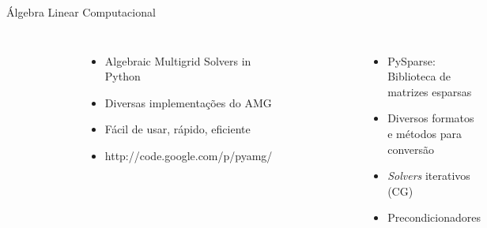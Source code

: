 \documentclass[12pt,t,graphics]{beamer}
\begin{document}
\begin{frame}[t]{Álgebra Linear Computacional}
	\begin{columns}
		\begin{figure}
			\centering
			\includegraphics[scale=0.2]{img/pyamg.png}
		\end{figure}
		\begin{itemize}
			\item Algebraic Multigrid Solvers in Python
			\item Diversas implementações do AMG
			\item Fácil de usar, rápido, eficiente
			\item http://code.google.com/p/pyamg/
		\end{itemize}
		\begin{figure}
			\centering
			\includegraphics[scale=0.65]{img/logo_pysparse.png}
		\end{figure}
		\begin{itemize}
			\item PySparse: Biblioteca de matrizes esparsas
			\item Diversos formatos e métodos para conversão
			\item \textit{Solvers} iterativos (CG)
			\item Precondicionadores
		\end{itemize}
	\end{columns}
	
\end{frame}
\end{document}

